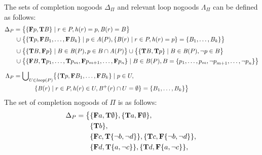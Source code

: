\begin{Loesung}
\noindent\textnormal{%
The sets of completion nogoods $\Delta_\Pi$ and relevant loop nogoods $\Lambda_\Pi$ can be defined as follows:
{\small
\begin{align*}
  \Delta_P = {} &  
  \big\{
  \{\mathbf{F}p,\mathbf{T}B\} 
  \mid r\in P,\mathit{h}(r)=p,\mathit{B}(r)=B
  \big\}
\\
  {} \cup {} & 
  \big\{ 
  \{\mathbf{T}p,\mathbf{F}B_1,\dots,\mathbf{F}B_k\}
  \mid
  p\in \mathit{A}(P),
  \{\mathit{B}(r)\mid r\in P,\mathit{h}(r)=p\}=
  \{B_1,\dots,B_k\}
  \big\}
\\[1mm]
  {} \cup {} & 
  \big\{ 
  \{\mathbf{T}B,\mathbf{F}p\}
  \mid
  B\in \mathit{B}(P),p\in B\cap\mathit{A}(P)
  \big\}
  \cup
  \big\{  
  \{\mathbf{T}B,\mathbf{T}p\}
  \mid
  B\in \mathit{B}(P),{\neg{p}}\in B
  \big\}
\\
  {} \cup {} & 
  \big\{ 
  \{\mathbf{F}B,\mathbf{T}p_1,\dots,\mathbf{T}p_m,\mathbf{F}p_{m+1},\dots,\mathbf{F}p_n\}
  \mid
  B\in \mathit{B}(P),B=\{p_1,\dots,p_m,{\neg{p}}_{m+1},\dots,{\neg{p}}_n\}  
  \big\}
\\[2mm]
  \Lambda_P = {} &   
  \textnormal{$\bigcup$}_{U\in\mathit{loop}(P)}
  \big\{  
  \{\mathbf{T}p,\mathbf{F}B_1,\dots,\mathbf{F}B_k\}
  \mid
  p\in U, {}
\\ & \qquad
  \{\mathit{B}(r)\mid r\in P,\mathit{h}(r)\in U,\mathit{B}^+(r)\cap U=\emptyset\}=
  \{B_1,\dots,B_k\}
  \big\}
\end{align*}}%
\newline
The set of completion nogoods of $\Pi$ is as follows:
\begin{align*}
  \Delta_\Pi = \big\{ &    
  \{\mathbf{F}a,\mathbf{T}\emptyset\},\{\mathbf{T}a,\mathbf{F}\emptyset\},
  {} \\ &
  \{\mathbf{T}b\},
  {} \\ &
  \{\mathbf{F}c,\mathbf{T}\{\naf b,\naf d\}\},  
  \{\mathbf{T}c,\mathbf{F}\{\naf b,\naf d\}\},
  {} \\ &
  \{\mathbf{F}d,\mathbf{T}\{a,\naf c\}\},  
  \{\mathbf{T}d,\mathbf{F}\{a,\naf c\}\},

\end{align*}}
\end{Loesung}
